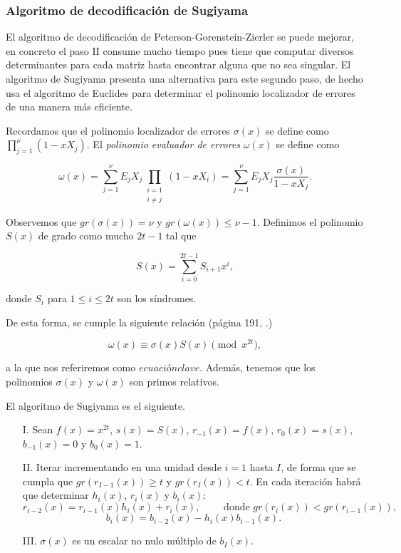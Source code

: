 \subsubsection{Algoritmo de decodificación de Sugiyama}

El algoritmo de decodificación de Peterson-Gorenstein-Zierler se puede mejorar, en concreto el paso II consume mucho tiempo pues tiene que computar diversos determinantes para cada matriz hasta encontrar alguna que no sea singular. El algoritmo de Sugiyama presenta una alternativa para este segundo paso, de hecho usa el algoritmo de Euclides para determinar el polinomio localizador de errores de una manera más eficiente.

Recordamos que el polinomio localizador de errores $\sigma(x)$ se define como $\prod_{j=1}^{\nu} (1 - xX_j)$. El \emph{polinomio evaluador de errores} $\omega(x)$ se define como

\begin{equation}
    \label{def:polinomio_evaluador_errores}
    \omega(x) = \sum_{j=1}^{\nu} E_j X_j \prod_{\substack{i=1\\ i \neq j}} (1 - xX_i) = \sum_{j=1}^{\nu} E_j X_j \frac{\sigma(x)}{1 - xX_j}.
\end{equation}

Observemos que $gr(\sigma(x)) = \nu$ y $gr(\omega(x)) \leq \nu - 1$. Definimos el polinomio $S(x)$ de grado como mucho $2t - 1$ tal que 

$$S(x) = \sum_{i=0}^{2t - 1} S_{i+1} x^i,$$

donde $S_i$ para $1 \leq i \leq 2t$ son los síndromes.

De esta forma, se cumple la siguiente relación (página 191, \cite{Huffman_Pless_2010}.)

$$\omega(x) \equiv \sigma(x) S(x) \pmod{x^{2t}},$$

a la que nos referiremos como $ecuación clave$. Además, tenemos que los polinomios $\sigma(x)$ y $\omega(x)$ son primos relativos.

El algoritmo de Sugiyama es el siguiente.

\begin{itemize}
    \item[I.] Sean $f(x) = x^{2t}$, $s(x) = S(x)$, $r_{-1}(x) = f(x)$, $r_0(x) = s(x)$, $b_{-1}(x) = 0$ y $b_0(x) = 1$.
    \item[II.] Iterar incrementando en una unidad desde $i = 1$ hasta $I$, de forma que se cumpla que $gr(r_{I-1}(x)) \geq t$ y $gr(r_I(x)) < t$. En cada iteración habrá que determinar $h_i(x)$, $r_i(x)$ y $b_i(x)$:
        $$r_{i-2}(x) = r_{i-1}(x) h_i(x) + r_i (x), \qquad \text{ donde } gr(r_i(x)) < gr(r_{i-1}(x)),$$
        $$b_i(x) = b_{i-2}(x) - h_i(x) b_{i-1}(x).$$
    \item[III.] $\sigma(x)$ es un escalar no nulo múltiplo de $b_I(x)$. 
\end{itemize}

